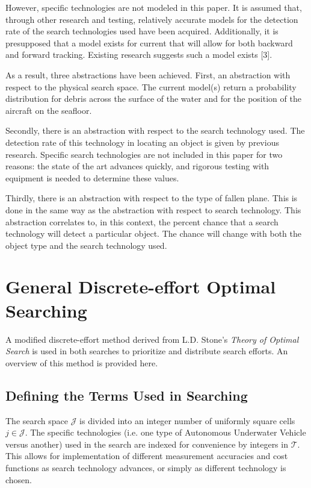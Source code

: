 \documentclass[a4paper]{article}
\begin{document}
However, specific technologies are not modeled in this paper. It is assumed that, through other research and testing, relatively accurate models for the detection rate of the search technologies used have been acquired. Additionally, it is presupposed that a model exists for current that will allow for both backward and forward tracking. Existing research suggests such a model exists [3].

As a result, three abstractions have been achieved. First, an abstraction with respect to the physical search space. The current model(s) return a probability distribution for debris across the surface of the water and for the position of the aircraft on the seafloor. 

Secondly, there is an abstraction with respect to the search technology used. The detection rate of this technology in locating an object is given by previous research. Specific search technologies are not included in this paper for two reasons: the state of the art advances quickly, and rigorous testing with equipment is needed to determine these values. 

Thirdly, there is an abstraction with respect to the type of fallen plane. This is done in the same way as the abstraction with respect to search technology. This abstraction correlates to, in this context, the percent chance that a search technology will detect a particular object. The chance will change with both the object type and the search technology used.

\section{General Discrete-effort Optimal Searching}

A modified discrete-effort method derived from L.D. Stone's \textit{Theory of Optimal Search} is used in both searches to prioritize and distribute search efforts. An overview of this method is provided here. 

\subsection{Defining the Terms Used in Searching}

The search space $\mathcal{J}$ is divided into an integer number of uniformly square cells $j\in\mathcal{J}$. The specific technologies (i.e. one type of Autonomous Underwater Vehicle versus another) used in the search are indexed for convenience by integers in $\mathcal{T}$. This allows for implementation of different measurement accuracies and cost functions as search technology advances, or simply as different technology is chosen. 
\end{document}
